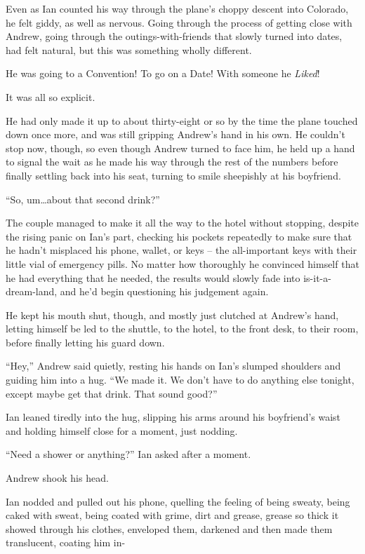 Even as Ian counted his way through the plane's choppy descent into Colorado, he felt giddy, as well as nervous. Going through the process of getting close with Andrew, going through the outings-with-friends that slowly turned into dates, had felt natural, but this was something wholly different.

He was going to a Convention! To go on a Date! With someone he \emph{Liked}!

It was all so explicit.

He had only made it up to about thirty-eight or so by the time the plane touched down once more, and was still gripping Andrew's hand in his own. He couldn't stop now, though, so even though Andrew turned to face him, he held up a hand to signal the wait as he made his way through the rest of the numbers before finally settling back into his seat, turning to smile sheepishly at his boyfriend.

``So, um\ldots{}about that second drink?''

\secdiv{}

The couple managed to make it all the way to the hotel without stopping, despite the rising panic on Ian's part, checking his pockets repeatedly to make sure that he hadn't misplaced his phone, wallet, or keys -- the all-important keys with their little vial of emergency pills. No matter how thoroughly he convinced himself that he had everything that he needed, the results would slowly fade into is-it-a-dream-land, and he'd begin questioning his judgement again.

He kept his mouth shut, though, and mostly just clutched at Andrew's hand, letting himself be led to the shuttle, to the hotel, to the front desk, to their room, before finally letting his guard down.

``Hey,'' Andrew said quietly, resting his hands on Ian's slumped shoulders and guiding him into a hug. ``We made it. We don't have to do anything else tonight, except maybe get that drink. That sound good?''

Ian leaned tiredly into the hug, slipping his arms around his boyfriend's waist and holding himself close for a moment, just nodding.

``Need a shower or anything?'' Ian asked after a moment.

Andrew shook his head.

Ian nodded and pulled out his phone, quelling the feeling of being sweaty, being caked with sweat, being coated with grime, dirt and grease, grease so thick it showed through his clothes, enveloped them, darkened and then made them translucent, coating him in-

